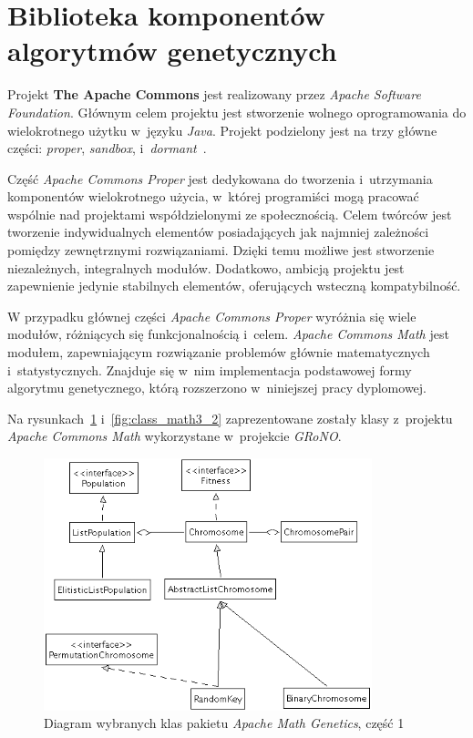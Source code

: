 \documentclass[twoside,12pt]{report}
\begin{document}
\section{Biblioteka komponentów algorytmów genetycznych}
Projekt \textbf{The Apache Commons} jest realizowany przez \textit{Apache Software Foundation}. Głównym celem projektu jest stworzenie wolnego oprogramowania do wielokrotnego użytku w~języku \textit{Java}. Projekt podzielony jest na trzy główne części: \textit{proper}, \textit{sandbox}, i~\textit{dormant}~\cite{math}.

Część \textit{ Apache Commons Proper} jest dedykowana do tworzenia i~utrzymania komponentów wielokrotnego użycia, w~której programiści mogą pracować wspólnie nad projektami współdzielonymi ze społecznością. Celem twórców jest tworzenie indywidualnych elementów posiadających jak najmniej zależności pomiędzy zewnętrznymi rozwiązaniami. Dzięki temu możliwe jest stworzenie niezależnych, integralnych modułów. Dodatkowo, ambicją projektu jest zapewnienie jedynie stabilnych elementów, oferujących wsteczną kompatybilność.

W przypadku głównej części\textit{ Apache Commons Proper} wyróżnia się wiele modułów, różniących się funkcjonalnością i~celem. \textit{Apache Commons Math} jest modułem, zapewniającym rozwiązanie problemów głównie matematycznych i~statystycznych. Znajduje się w~nim implementacja podstawowej formy algorytmu genetycznego, którą rozszerzono w~niniejszej pracy dyplomowej.

Na rysunkach~\ref{fig:class_math3_1} i~\ref{fig:class_math3_2} zaprezentowane zostały klasy z~projektu \textit{Apache Commons Math} wykorzystane w~projekcie \textit{GRoNO}. 

\begin{figure}[htbp]
	\centering
	\includegraphics[width=0.85\textwidth]{img/math3-1}
	\caption{Diagram wybranych klas pakietu \textit{Apache Math Genetics}, część 1}
	\label{fig:class_math3_1}
\end{figure}
\end{document}

